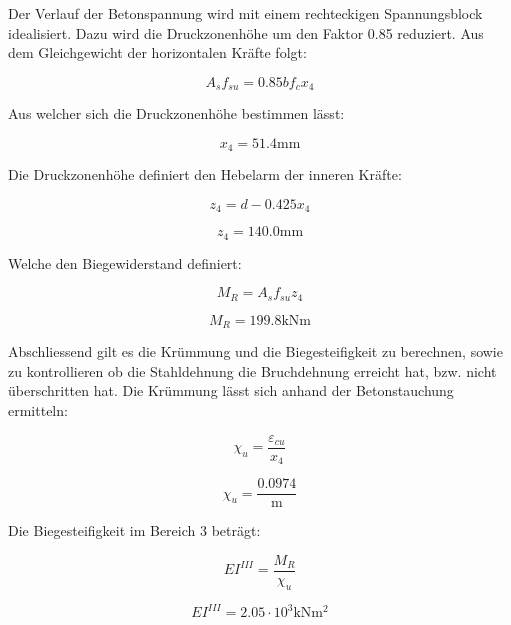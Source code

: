 \documentclass[
  12pt,
  letterpaper,
  egregdoesnotlikesansseriftitles]{scrreprt}
\begin{document}
Der Verlauf der Betonspannung wird mit einem rechteckigen Spannungsblock
idealisiert. Dazu wird die Druckzonenhöhe um den Faktor 0.85 reduziert.
Aus dem Gleichgewicht der horizontalen Kräfte folgt:

\begin{equation}A_{s} f_{su} = 0.85 b f_{c} x_{4}\end{equation}

Aus welcher sich die Druckzonenhöhe bestimmen lässt:

\begin{equation}x_{4} = 51.4 \text{mm}\end{equation}

Die Druckzonenhöhe definiert den Hebelarm der inneren Kräfte:

\begin{equation}z_{4} = d - 0.425 x_{4}\end{equation}

\begin{equation}z_{4} = 140.0 \text{mm}\end{equation}

Welche den Biegewiderstand definiert:

\begin{equation}M_{R} = A_{s} f_{su} z_{4}\end{equation}

\begin{equation}M_{R} = 199.8 \text{kN} \text{m}\end{equation}

Abschliessend gilt es die Krümmung und die Biegesteifigkeit zu
berechnen, sowie zu kontrollieren ob die Stahldehnung die Bruchdehnung
erreicht hat, bzw. nicht überschritten hat. Die Krümmung lässt sich
anhand der Betonstauchung ermitteln:

\begin{equation}\chi_{u} = \frac{\varepsilon_{cu}}{x_{4}}\end{equation}

\begin{equation}\chi_{u} = \frac{0.0974}{\text{m}}\end{equation}

Die Biegesteifigkeit im Bereich 3 beträgt:

\begin{equation}EI^{III} = \frac{M_{R}}{\chi_{u}}\end{equation}

\begin{equation}EI^{III} = 2.05 \cdot 10^{3} \text{kN} \text{m}^{2}\end{equation}
\end{document}
